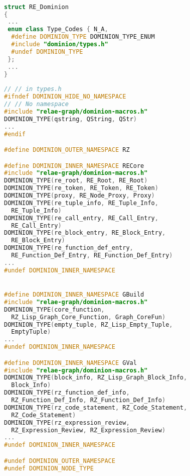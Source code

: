 \begin{lstlisting}[caption={%
\emblink{\#lst--dominion-types--\thelstlisting.pgvm-pdf}{Asserting Vertex Types}},
  language = C++, numbers = none, escapechar = !,label={lst:dominion-types},
    basicstyle = \ttfamily\bfseries\footnotesize, linewidth = \linewidth]

struct RE_Dominion
{
 ...
 enum class Type_Codes { N_A,
  #define DOMINION_TYPE DOMINION_TYPE_ENUM
  #include "dominion/types.h"
  #undef DOMINION_TYPE
 };
 ...
}
 
// // in types.h
#ifndef DOMINION_HIDE_NO_NAMESPACE
// // No namespace
#include "relae-graph/dominion-macros.h"
DOMINION_TYPE(qstring, QString, QStr)
...
#endif

#define DOMINION_OUTER_NAMESPACE RZ

#define DOMINION_INNER_NAMESPACE RECore
#include "relae-graph/dominion-macros.h"
DOMINION_TYPE(re_root, RE_Root, RE_Root)
DOMINION_TYPE(re_token, RE_Token, RE_Token)
DOMINION_TYPE(proxy, RE_Node_Proxy, Proxy)
DOMINION_TYPE(re_tuple_info, RE_Tuple_Info, 
  RE_Tuple_Info)
DOMINION_TYPE(re_call_entry, RE_Call_Entry, 
  RE_Call_Entry)
DOMINION_TYPE(re_block_entry, RE_Block_Entry, 
  RE_Block_Entry)
DOMINION_TYPE(re_function_def_entry, 
  RE_Function_Def_Entry, RE_Function_Def_Entry)
...
#undef DOMINION_INNER_NAMESPACE


#define DOMINION_INNER_NAMESPACE GBuild
#include "relae-graph/dominion-macros.h"
DOMINION_TYPE(core_function, 
  RZ_Lisp_Graph_Core_Function, Graph_CoreFun)
DOMINION_TYPE(empty_tuple, RZ_Lisp_Empty_Tuple, 
  EmptyTuple)
...
#undef DOMINION_INNER_NAMESPACE

#define DOMINION_INNER_NAMESPACE GVal
#include "relae-graph/dominion-macros.h"
DOMINION_TYPE(block_info, RZ_Lisp_Graph_Block_Info, 
  Block_Info)
DOMINION_TYPE(rz_function_def_info, 
  RZ_Function_Def_Info, RZ_Function_Def_Info)
DOMINION_TYPE(rz_code_statement, RZ_Code_Statement, 
  RZ_Code_Statement)
DOMINION_TYPE(rz_expression_review, 
  RZ_Expression_Review, RZ_Expression_Review)
...
#undef DOMINION_INNER_NAMESPACE

#undef DOMINION_OUTER_NAMESPACE
#undef DOMINION_NODE_TYPE

\end{lstlisting}

